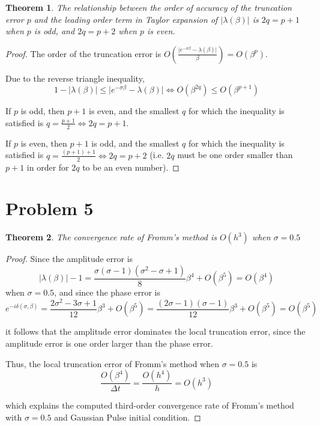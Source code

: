 \documentclass[a4paper]{amsproc}
\theoremstyle{plain}
\newtheorem*{thm}{Theorem}
\theoremstyle{definition}
\theoremstyle{remark}
\numberwithin{equation}{section}
\renewcommand{\le}{\leqslant}\renewcommand{\leq}{\leqslant}
\begin{document}
\begin{thm}
The relationship between the order of accuracy of the truncation error $p$ and the leading order term in Taylor expansion of $\lvert \lambda(\beta) \rvert$ is $2q = p + 1$ when $p$ is odd, and $2q = p + 2$ when $p$ is even. 
\end{thm}

\begin{proof}

The order of the truncation error is $ O(\frac{\lvert e^{-\sigma\beta} - \lambda(\beta) \rvert}{\beta}) = O(\beta^{p})$.

Due to the reverse triangle inequality, $$ 1 - \lvert \lambda(\beta) \rvert \le \lvert e^{-\sigma\beta} - \lambda(\beta) \rvert \Longleftrightarrow O(\beta^{2q}) \le O(\beta^{p+1})$$

If $p$ is odd, then $p+1$ is even, and the smallest $q$ for which the inequality is satisfied is $q = \frac{p+1}{2} \Longleftrightarrow 2q = p+1$.

If $p$ is even, then $p+1$ is odd, and the smallest $q$ for which the inequality is satisfied is $q = \frac{(p+1)+1}{2} \Longleftrightarrow 2q = p+2$ (i.e. $2q$ must be one order smaller than $p+1$ in order for $2q$ to be an even number).

\end{proof}

\section*{Problem 5}

\begin{thm}
The convergence rate of Fromm's method is $O(h^3)$ when $\sigma = 0.5$
\end{thm}

\begin{proof}
Since the amplitude error is 
$$ \lvert \lambda(\beta) \rvert -1 = \frac{\sigma(\sigma-1)(\sigma^2 - \sigma + 1)}{8} \beta^4 + O(\beta^5) = O(\beta^4)$$
when $\sigma = 0.5$, and since the phase error is
$$ e^{-i\delta(\sigma,\beta)} = \frac{2\sigma^2- 3\sigma + 1}{12} \beta^3 + O(\beta^5) = \frac{(2\sigma- 1)(\sigma - 1)}{12} \beta^3 + O(\beta^5) = O(\beta^5) $$

it follows that the amplitude error dominates the local truncation error, since the amplitude error is one order larger than the phase error. 

Thus, the local truncation error of Fromm's method when $\sigma = 0.5$ is $$ \frac{O(\beta^4)}{\Delta t} = \frac{O(h^4)}{h} = O(h^3)$$

which explains the computed third-order convergence rate of Fromm's method with $\sigma = 0.5$ and Gaussian Pulse initial condition.

\end{proof}
\end{document}
